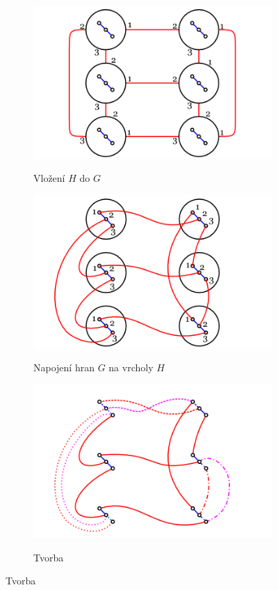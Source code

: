 \begin{figure}
\centering
\begin{subfigure}{7.5cm}{\includegraphics[width=\textwidth]{img/zigzag1.png}}\caption{Vložení
$H$ do $G$}\end{subfigure}
\begin{subfigure}{7.5cm}{\includegraphics[width=\textwidth]{img/zigzag2.png}}\caption{Napojení
hran $G$ na vrcholy $H$}\end{subfigure}
\begin{subfigure}{7.5cm}{\includegraphics[width=\textwidth]{img/zigzag3.png}}\caption{Tvorba
}
\end{subfigure}
\end{figure}
